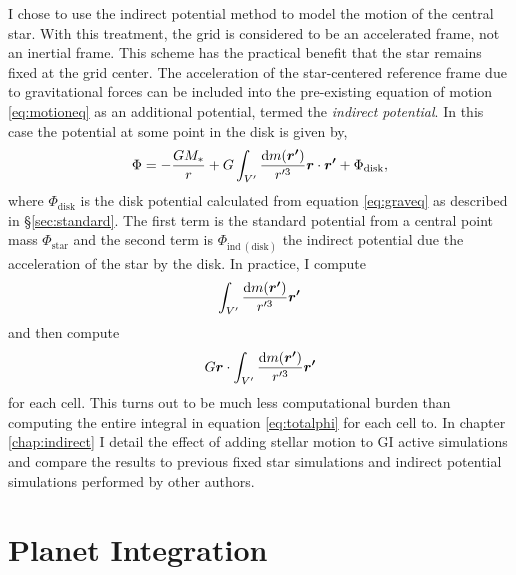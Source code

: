 I chose to use the indirect potential method \citep{nelson2000b} to model the motion of the central star. With this treatment, the grid is considered to be an accelerated frame, not an inertial frame. This scheme has the practical benefit that the star remains fixed at the grid center. The acceleration of the star-centered reference frame due to gravitational forces can be included into the pre-existing equation of motion \eqref{eq:motioneq} as an additional potential, termed the {\it indirect potential}.    
In this case the potential at some point in the disk is given by,
\begin{equation}
\Phi = -\frac{GM_{\ast}}{r} + G\int_{V^\prime} \frac{\mathrm{d} m(\boldsymbol{r^\prime})}{r^{\prime3}}\boldsymbol{r}\cdot\boldsymbol{r^\prime} + \Phi_{\mathrm{disk}},\label{eq:totalphi}
\end{equation}
where $\Phi_{\mathrm{disk}}$ is the disk potential calculated from equation \eqref{eq:graveq} as described in \S\ref{sec:standard}. The first term is the standard potential from a central point mass $\Phi_{\mathrm{star}}$ and the second term is $\Phi_{\mathrm{ind~(disk)}}$ the indirect potential due the acceleration of the star by the disk. In practice, I compute
\begin{equation}
\int_{V^\prime}\frac{\mathrm{d} m(\boldsymbol{r^\prime})}{r^{\prime3}} \boldsymbol{r^\prime}
\end{equation} 
and then compute
\begin{equation}
G\boldsymbol{r} \cdot \int_{V^\prime}\frac{\mathrm{d} m(\boldsymbol{r^\prime})}{r^{\prime3}} \boldsymbol{r^\prime}
\end{equation}
for each cell.
This turns out to be much less computational burden than computing the entire integral in equation \eqref{eq:totalphi} for each cell to. In chapter \ref{chap:indirect} I detail the effect of adding stellar motion to GI active simulations and compare the results to previous fixed star simulations and indirect potential simulations performed by other authors.

\section{Planet Integration} \label{sec:planetintegrate}

